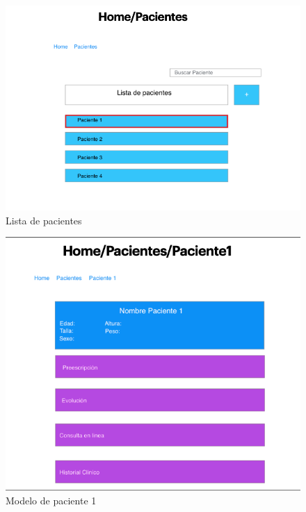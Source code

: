 \documentclass[12pt]{article}
\begin{document}
\begin{figure}[ht]
\centering
\includegraphics[scale=0.4]{imag/P4.png}
\caption{Lista de pacientes }
\label{6}
\end{figure}
\FloatBarrier


\begin{figure}[ht]
\centering
\includegraphics[scale=0.4]{imag/P5.png}
\caption{Modelo de paciente 1 }
\label{6}
\end{figure}
\FloatBarrier
\end{document}

